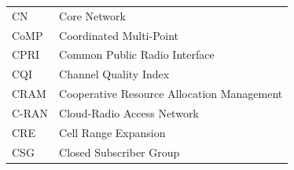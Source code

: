 %

\begin{tabular}{ll}

CN & Core Network\\
%
%
CoMP & Coordinated Multi-Point\\
CPRI & Common Public Radio Interface\\
CQI & Channel Quality Index\\
CRAM & Cooperative Resource Allocation Management\\
C-RAN & Cloud-Radio Access Network\\
CRE & Cell Range Expansion\\
CSG & Closed Subscriber Group\\


\end{tabular}
